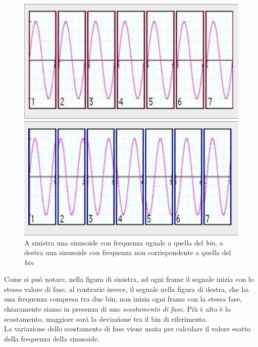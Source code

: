 \documentclass[12pt]{report}
\begin{document}
\begin{figure}[htbp]  \centering 
	\begin{minipage}[c]{.40\textwidth} 
		\centering
		\includegraphics[width= 1.0 \textwidth]{img/inphase} 
	\end{minipage}%
	\hspace{10mm}%
	\begin{minipage}[c]{.40\textwidth} 
		\centering
		\includegraphics[width= 1.0 \textwidth]{img/nonphase} 
	\end{minipage} 
	\caption{A sinistra una sinusoide con frequenza uguale a quella del {\itshape bin}, a destra una sinusoide con frequenza non corrispondente a quella del {\itshape bin}}
	\label{fig:phase}
\end{figure} 
			
Come si può notare, nella figura di sinistra, ad ogni frame il segnale inizia con lo stesso valore di fase, al contrario invece, il segnale nella figura di destra, che ha una frequenza compresa tra due bin, non inizia ogni frame con la stessa fase, chiaramente siamo in presenza di uno {\itshape scostamento di fase}. Più è alto è lo scostamento, maggiore sarà la deviazione tra il bin di riferimento.
\\
La variazione dello scostamento di fase viene usata per calcolare il valore esatto della frequenza della sinusoide.
\end{document}
